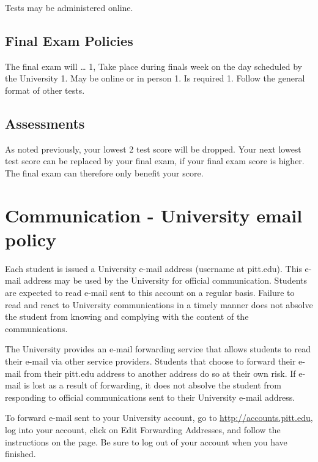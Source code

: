 \documentclass[
]{book}
\begin{document}
Tests may be administered online.

\hypertarget{final-exam-policies}{%
\section{Final Exam Policies}\label{final-exam-policies}}

The final exam will \ldots{}
1, Take place during finals week on the day scheduled by the University
1. May be online or in person
1. Is required
1. Follow the general format of other tests.

\hypertarget{assessments-1}{%
\section{Assessments}\label{assessments-1}}

As noted previously, your lowest 2 test score will be dropped. Your next lowest test score can be replaced by your final exam, if your final exam score is higher. The final exam can therefore only benefit your score.

\hypertarget{communication---university-email-policy}{%
\chapter{Communication - University email policy}\label{communication---university-email-policy}}

Each student is issued a University e-mail address (username at pitt.edu). This e-mail address may be used by the University for official communication. Students are expected to read e-mail sent to this account on a regular basis. Failure to read and react to University communications in a timely manner does not absolve the student from knowing and complying with the content of the communications.

The University provides an e-mail forwarding service that allows students to read their e-mail via other service providers. Students that choose to forward their e-mail from their pitt.edu address to another address do so at their own risk. If e-mail is lost as a result of forwarding, it does not absolve the student from responding to official communications sent to their University e-mail address.

To forward e-mail sent to your University account, go to \url{http://accounts.pitt.edu}, log into your account, click on Edit Forwarding Addresses, and follow the instructions on the page. Be sure to log out of your account when you have finished.
\end{document}
